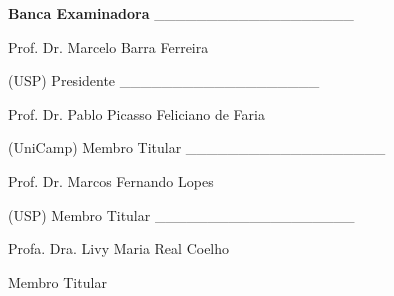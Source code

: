 \begin{folhadeaprovacao}
  \textbf{\Large{Banca Examinadora}}
  \vskip 2cm
    \_\_\_\_\_\_\_\_\_\_\_\_\_\_\_\_\_\_\_
  
    Prof. Dr. Marcelo Barra Ferreira
    
    (USP) Presidente
    \vskip 2cm
    \_\_\_\_\_\_\_\_\_\_\_\_\_\_\_\_\_\_\_
      
    Prof. Dr. Pablo Picasso Feliciano de Faria
    
    (UniCamp) Membro Titular
    \vskip 2cm
    \_\_\_\_\_\_\_\_\_\_\_\_\_\_\_\_\_\_\_
    
    Prof. Dr. Marcos Fernando Lopes

    (USP) Membro Titular
    \vskip 2cm
    \_\_\_\_\_\_\_\_\_\_\_\_\_\_\_\_\_\_\_
    
    Profa. Dra. Livy Maria Real Coelho
    
    Membro Titular
  
    

\end{folhadeaprovacao}
